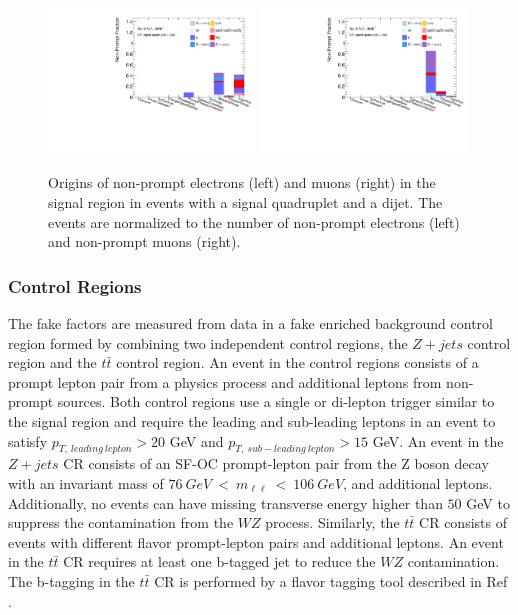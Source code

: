 \begin{figure}[!htb]
    \centering
    \includegraphics[width = 0.49\textwidth]{figures/Analysis/Background/NonPromptElectronSRVBSComposition.pdf}
    \includegraphics[width = 0.49\textwidth]{figures/Analysis/Background/NonPromptMuonSRVBSComposition.pdf}
    \caption{ Origins of non-prompt electrons (left) and muons (right) in the signal region in events with a signal quadruplet and a dijet. The events are normalized to the number of non-prompt electrons (left) and non-prompt muons (right). \label{fig:NonPromptLepSRDijet}}
\end{figure}

\subsubsection{Control Regions}
\label{subsubsec:CR}
The fake factors are measured from data in a fake enriched background control region formed by combining two independent control regions, the $Z+jets$ control region and the $t\bar{t}$ control region. An event in the control regions consists of a prompt lepton pair from a physics process and additional leptons from non-prompt sources. Both control regions use a single or di-lepton trigger similar to the signal region and require the leading and sub-leading leptons in an event to satisfy $p_{T,~leading~lepton} > 20$ GeV and $p_{T,~sub-leading~lepton} > 15$ GeV. An event in the $Z+jets$ CR consists of an SF-OC prompt-lepton pair from the Z boson decay with an invariant mass of $ 76~GeV~<~m_{\ell \ell}~<~106~GeV$, and additional leptons. Additionally, no events can have missing transverse energy higher than $50$ GeV to suppress the contamination from the $WZ$ process. Similarly, the $t\bar{t}$ CR consists of events with different flavor prompt-lepton pairs and additional leptons. An event in the $t\bar{t}$ CR requires at least one b-tagged jet to reduce the $WZ$ contamination. The b-tagging in the $t\bar{t}$ CR is performed by a flavor tagging tool described in Ref \cite{btagATLAS}.

